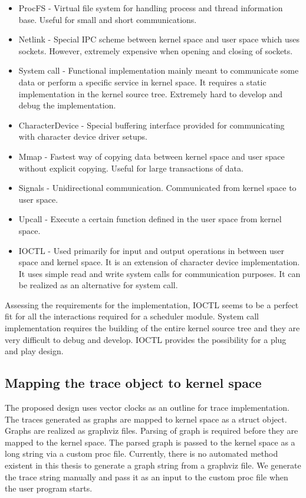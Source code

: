 \begin{itemize}
\item ProcFS - Virtual file system for handling process and thread information base. Useful for small and short communications. 
\item Netlink - Special IPC scheme between kernel space and user space which uses sockets. However, extremely expensive when opening and closing of sockets.
\item System call - Functional implementation mainly meant to communicate some data or perform a specific service in kernel space. It requires a static implementation in the kernel source tree. Extremely hard to develop and debug the implementation.
\item CharacterDevice - Special buffering interface provided for communicating with character device driver setups.
\item Mmap - Fastest way of copying data between kernel space and user space without explicit copying. Useful for large transactions of data.
\item Signals - Unidirectional communication. Communicated from kernel space to user space. 
\item Upcall - Execute a certain function defined in the user space from kernel space.
\item IOCTL - Used primarily for input and output operations in between user space and kernel space. It is an extension of character device implementation. It uses simple read and write system calls for communication purposes. It can be realized as an alternative for system call.

\end{itemize}


Assessing the requirements for the implementation, IOCTL seems to be a perfect fit for all the interactions required for a scheduler module. 
System call implementation requires the building of the entire kernel source tree and they are very difficult to debug and develop. 
IOCTL provides the possibility for a plug and play design.

\subsection{Mapping the trace object to kernel space}

The proposed design uses vector clocks as an outline for trace implementation. 
The traces generated as graphs are mapped to kernel space as a struct object. 
Graphs are realized as graphviz files. 
Parsing of graph is required before they are mapped to the kernel space. 
The parsed graph is passed to the kernel space as a long string via a custom proc file. 
Currently, there is no automated method existent in this thesis to generate a graph string from a graphviz file. 
We generate the trace string manually and pass it as an input to the custom proc file when the user program starts.

